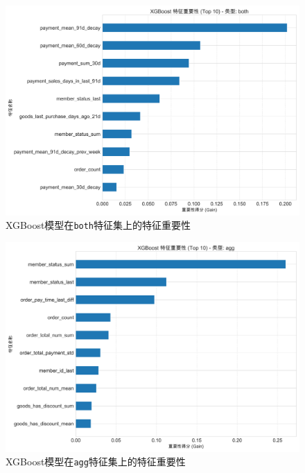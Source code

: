 \documentclass[11pt, a4paper]{article}
\begin{document}
\begin{figure}[H]
    \centering
    \includegraphics[width=\textwidth]{../analysis/xgb_both_feature_importance.png}
    \caption{XGBoost模型在\texttt{both}特征集上的特征重要性}
    \label{fig:xgb_both}
\end{figure}

\begin{figure}[H]
    \centering
    \includegraphics[width=\textwidth]{../analysis/xgb_agg_feature_importance.png}
    \caption{XGBoost模型在\texttt{agg}特征集上的特征重要性}
    \label{fig:xgb_agg}
\end{figure}
\end{document}
